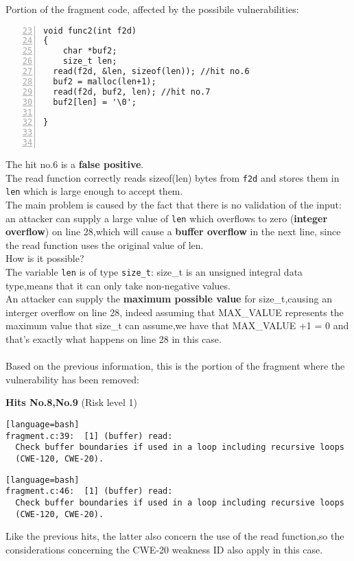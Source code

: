 \documentclass[a4paper,12pt]{article}
\begin{document}
\noindent
Portion of the fragment code, affected by the possibile vulnerabilities:
\begin{lstlisting}[style=c,numbers=left,firstnumber=23,linebackgroundcolor={
\ifnum\value{lstnumber}=27\color{green}\fi
\ifnum\value{lstnumber}=28\color{red}\fi
\ifnum\value{lstnumber}=29\color{red}\fi}]
void func2(int f2d)
{
	char *buf2;
	size_t len;
  read(f2d, &len, sizeof(len)); //hit no.6
  buf2 = malloc(len+1); 
  read(f2d, buf2, len); //hit no.7
  buf2[len] = '\0';

}



\end{lstlisting}
The hit no.6 is a \textbf{false positive}.\\
The read function correctly reads sizeof(len) bytes from \texttt{f2d} and stores them in \texttt{len} which is large enough to accept them.\\
The main problem is caused by the fact that there is no validation of the input: an attacker can supply a large value of \texttt{len} which 
overflows to zero (\textbf{integer overflow}) on line 28,which will cause a \textbf{buffer overflow} in the next line, since the read function uses the original value of len.\\
How is it possible?\\
The variable \texttt{len} is of type \texttt{size\_t}: size\_t is an unsigned integral data type,means that it can only take non-negative values.\\
An attacker can supply the \textbf{maximum possible value} for size\_t,causing an interger overflow on line 28, indeed assuming that MAX\_VALUE represents the maximum value that size\_t can assume,we have that MAX\_VALUE +1 = 0 and that's exactly what happens on line 28 in this case.\\\\
Based on the previous information, this is the portion of the fragment where the vulnerability has been removed:



\newpage
\textbf{Hits No.8,No.9} (Risk level 1)

\begin{lstlisting}[style=DOS][language=bash]
fragment.c:39:  [1] (buffer) read:
  Check buffer boundaries if used in a loop including recursive loops
  (CWE-120, CWE-20).
\end{lstlisting}

\begin{lstlisting}[style=DOS][language=bash]
fragment.c:46:  [1] (buffer) read:
  Check buffer boundaries if used in a loop including recursive loops
  (CWE-120, CWE-20).
\end{lstlisting}
Like the previous hits, the latter also concern the use of the read function,so the considerations concerning the CWE-20 weakness ID also apply in this case.\\
\end{document}
